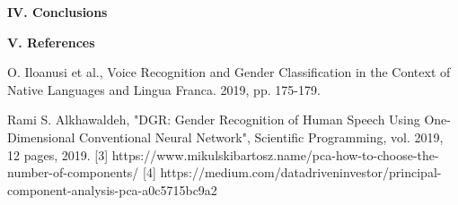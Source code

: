 \documentclass{article}
\begin{document}
\vspace{2mm}
\textbf{IV. Conclusions }\par


\vspace{2mm}
\textbf{V. References}\par
[1]	O. Iloanusi et al., Voice Recognition and Gender Classification in the Context of Native Languages and Lingua Franca. 2019, pp. 175-179.\par
[2] Rami S. Alkhawaldeh, "DGR: Gender Recognition of Human Speech Using One-Dimensional Conventional Neural Network", Scientific Programming, vol. 2019, 12 pages, 2019.
[3] https://www.mikulskibartosz.name/pca-how-to-choose-the-number-of-components/
[4] https://medium.com/datadriveninvestor/principal-component-analysis-pca-a0c5715bc9a2
\end{document}
